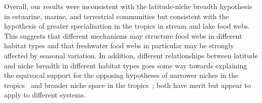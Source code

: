 \documentclass[12pt]{article}
\begin{document}
  Overall, our results were inconsistent with the latitude-niche breadth
  hypothesis in estuarine, marine, and terrestrial communities but consistent
  with the hypothesis of greater specialisation in the tropics in stream and
  lake food webs. This suggests that different mechanisms may structure food
  webs in different habitat types and that freshwater food webs in particular
  may be strongly affected by seasonal variation. In addition, different
  relationships between latitude and niche breadth in different habitat types
  goes some way towards explaining the equivocal support for the opposing
  hypotheses of narrower niches in the tropics~\citep{Vazquez2004} and broader
  niche space in the tropics~\citep{Davies2007}; both have merit but appear to
  apply to different systems.


\newpage

\newpage
\end{document}
